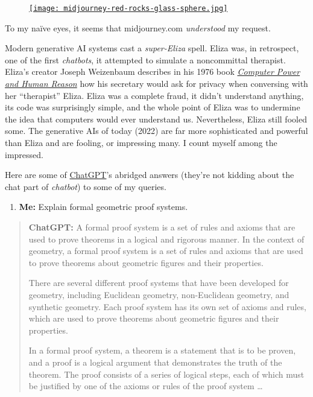 \captionsetup[figure]{labelformat=empty}
\begin{figure}[htbp]
\centering
\href{https://conceptcontrol.smugmug.com/Themes/Manipulations/Artificial-Impressions/i-mXpfTK8/A}{\texttt{[image: midjourney-red-rocks-glass-sphere.jpg]}}
\caption[\href{https://midjourney.com}{midjourney.com} red rock desert in glass sphere]{}
\label{fig:7681x1}
\end{figure}

To my naïve eyes, it seems that midjourney.com \emph{understood} my
request.

Modern generative AI systems cast a \emph{super-Eliza} spell. Eliza was,
in retrospect, one of the first \emph{chatbots}, it attempted to
simulate a noncommittal therapist. Eliza's creator Joseph Weizenbaum
describes in his 1976 book
\emph{\href{https://www.amazon.com/Computer-Power-Human-Reason-Calculation/dp/0716704633}{Computer
Power and Human Reason}} how his secretary would ask for privacy when
conversing with her ``therapist'' Eliza. Eliza was a complete fraud, it
didn't understand anything, its code was surprisingly simple, and the
whole point of Eliza was to undermine the idea that computers would ever
understand us. Nevertheless, Eliza still fooled some. The generative AIs
of today (2022) are far more sophisticated and powerful than Eliza and
are fooling, or impressing many. I count myself among the impressed.

Here are some of \href{https://openai.com/blog/chatgpt/}{ChatGPT}'s
abridged answers (they're not kidding about the chat part of
\emph{chatbot}) to some of my queries.

\begin{enumerate}
\def\labelenumi{\arabic{enumi}.}
\item
  \textbf{Me:} Explain formal geometric proof systems.
\end{enumerate}

\begin{quote}
\textbf{ChatGPT:} A formal proof system is a set of rules and axioms
that are used to prove theorems in a logical and rigorous manner. In the
context of geometry, a formal proof system is a set of rules and axioms
that are used to prove theorems about geometric figures and their
properties.

There are several different proof systems that have been developed for
geometry, including Euclidean geometry, non-Euclidean geometry, and
synthetic geometry. Each proof system has its own set of axioms and
rules, which are used to prove theorems about geometric figures and
their properties.

In a formal proof system, a theorem is a statement that is to be proven,
and a proof is a logical argument that demonstrates the truth of the
theorem. The proof consists of a series of logical steps, each of which
must be justified by one of the axioms or rules of the proof system
\ldots{}
\end{quote}

